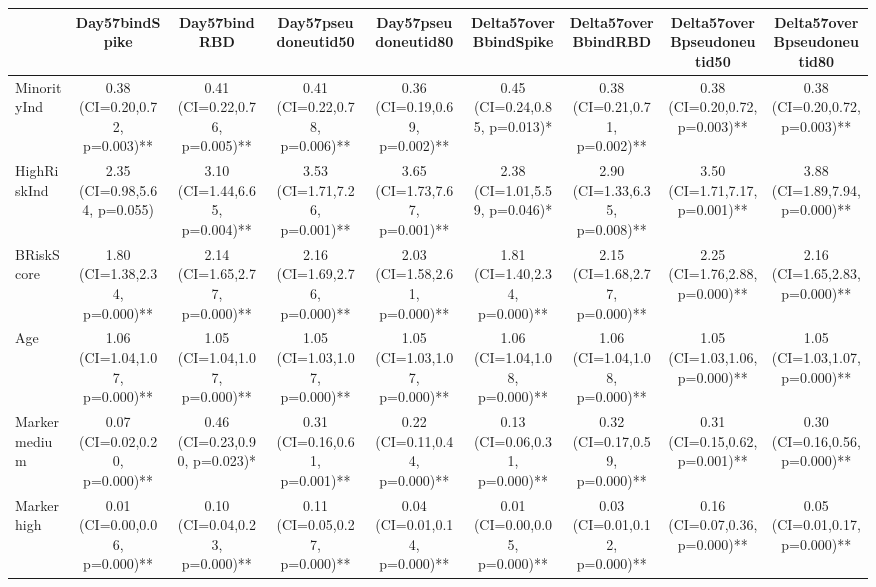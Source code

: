 \begin{tabular}{lcccccccc}
   \hline  &Day57bindSpike& Day57bindRBD& Day57pseudoneutid50& Day57pseudoneutid80& Delta57overBbindSpike& Delta57overBbindRBD& Delta57overBpseudoneutid50& Delta57overBpseudoneutid80\\ 
\hline
MinorityInd & 0.38 (CI=0.20,0.72, p=0.003)** & 0.41 (CI=0.22,0.76, p=0.005)** & 0.41 (CI=0.22,0.78, p=0.006)** & 0.36 (CI=0.19,0.69, p=0.002)** & 0.45 (CI=0.24,0.85, p=0.013)* & 0.38 (CI=0.21,0.71, p=0.002)** & 0.38 (CI=0.20,0.72, p=0.003)** & 0.38 (CI=0.20,0.72, p=0.003)** \\ 
  HighRiskInd & 2.35 (CI=0.98,5.64, p=0.055) & 3.10 (CI=1.44,6.65, p=0.004)** & 3.53 (CI=1.71,7.26, p=0.001)** & 3.65 (CI=1.73,7.67, p=0.001)** & 2.38 (CI=1.01,5.59, p=0.046)* & 2.90 (CI=1.33,6.35, p=0.008)** & 3.50 (CI=1.71,7.17, p=0.001)** & 3.88 (CI=1.89,7.94, p=0.000)** \\ 
  BRiskScore & 1.80 (CI=1.38,2.34, p=0.000)** & 2.14 (CI=1.65,2.77, p=0.000)** & 2.16 (CI=1.69,2.76, p=0.000)** & 2.03 (CI=1.58,2.61, p=0.000)** & 1.81 (CI=1.40,2.34, p=0.000)** & 2.15 (CI=1.68,2.77, p=0.000)** & 2.25 (CI=1.76,2.88, p=0.000)** & 2.16 (CI=1.65,2.83, p=0.000)** \\ 
  Age & 1.06 (CI=1.04,1.07, p=0.000)** & 1.05 (CI=1.04,1.07, p=0.000)** & 1.05 (CI=1.03,1.07, p=0.000)** & 1.05 (CI=1.03,1.07, p=0.000)** & 1.06 (CI=1.04,1.08, p=0.000)** & 1.06 (CI=1.04,1.08, p=0.000)** & 1.05 (CI=1.03,1.06, p=0.000)** & 1.05 (CI=1.03,1.07, p=0.000)** \\ 
  Marker medium & 0.07 (CI=0.02,0.20, p=0.000)** & 0.46 (CI=0.23,0.90, p=0.023)* & 0.31 (CI=0.16,0.61, p=0.001)** & 0.22 (CI=0.11,0.44, p=0.000)** & 0.13 (CI=0.06,0.31, p=0.000)** & 0.32 (CI=0.17,0.59, p=0.000)** & 0.31 (CI=0.15,0.62, p=0.001)** & 0.30 (CI=0.16,0.56, p=0.000)** \\ 
  Marker high & 0.01 (CI=0.00,0.06, p=0.000)** & 0.10 (CI=0.04,0.23, p=0.000)** & 0.11 (CI=0.05,0.27, p=0.000)** & 0.04 (CI=0.01,0.14, p=0.000)** & 0.01 (CI=0.00,0.05, p=0.000)** & 0.03 (CI=0.01,0.12, p=0.000)** & 0.16 (CI=0.07,0.36, p=0.000)** & 0.05 (CI=0.01,0.17, p=0.000)** \\ 
   \hline
\end{tabular}
